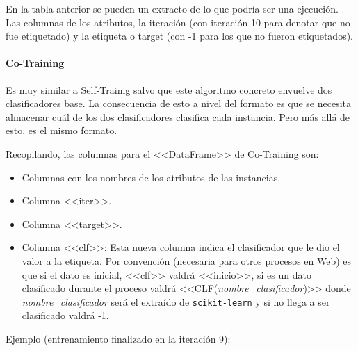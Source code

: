 En la tabla anterior se pueden un extracto de lo que podría ser una ejecución.
Las columnas de los atributos, la iteración (con iteración 10 para denotar que
no fue etiquetado) y la etiqueta o target (con -1 para los que no fueron
etiquetados).

\paragraph{Co-Training}
Es muy similar a Self-Trainig salvo que este algoritmo concreto envuelve dos
clasificadores base. La consecuencia de esto a nivel del formato es que se
necesita almacenar cuál de los dos clasificadores clasifica cada instancia. Pero
más allá de esto, es el mismo formato.

Recopilando, las columnas para el <<DataFrame>> de Co-Training son:

\begin{itemize}
    \item Columnas con los nombres de los atributos de las instancias.
    \item Columna <<iter>>.
    \item Columna <<target>>.
    \item Columna <<clf>>: Esta nueva columna indica el clasificador que le dio
    el valor  a la etiqueta. Por convención (necesaria para otros procesos en
    Web) es que si el dato es inicial, <<clf>> valdrá <<inicio>>, si es un dato
    clasificado durante el proceso valdrá <<CLF(\textit{nombre\_clasificador})>>
    donde \textit{nombre\_clasificador} será el extraído de \texttt{scikit-learn}
    y si no llega a ser clasificado valdrá -1.
\end{itemize}

Ejemplo (entrenamiento finalizado en la iteración 9):
\begin{table}[H]
    \caption{Ejemplo de DataFrame de Co-Training}
\end{table}


